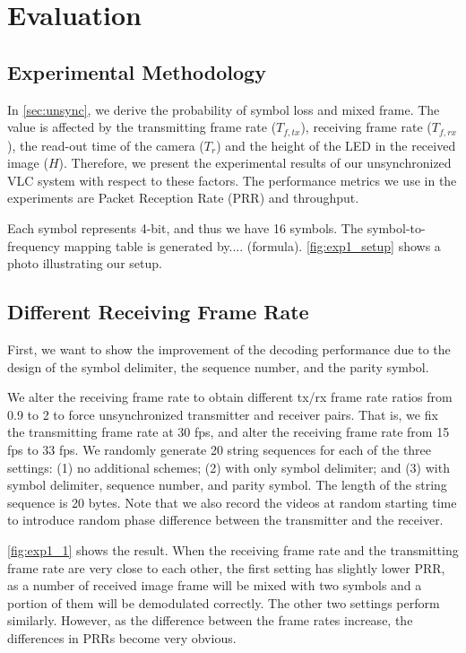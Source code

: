 \section{Evaluation}
\subsection{Experimental Methodology}
 In \autoref{sec:unsync}, we derive the probability of symbol loss and mixed frame. The value is affected by the transmitting frame rate ($T_{f,tx}$), receiving frame rate ($T_{f,rx}$), the read-out time of the camera ($T_r$) and the height of the LED in the received image ($H$). 
 Therefore, we present the experimental results of our unsynchronized VLC system with respect to these factors. The performance metrics we use in the experiments are Packet Reception Rate (PRR) and throughput.

 Each symbol represents 4-bit, and thus we have 16 symbols. 
 The symbol-to-frequency mapping table is generated by.... (formula).
 \autoref{fig:exp1_setup} shows a photo illustrating our setup. 

\subsection{Different Receiving Frame Rate}
First, we want to show the improvement of the decoding performance due to the design of the symbol delimiter, the sequence number, and the parity symbol. 

We alter the receiving frame rate to obtain different tx/rx frame rate ratios from 0.9 to 2 to force unsynchronized transmitter and receiver pairs. That is, we fix the transmitting frame rate at 30 fps, and alter the receiving frame rate from 15 fps to 33 fps. We randomly generate 20 string sequences for each of the three settings: (1) no additional schemes; (2) with only symbol delimiter; and (3) with symbol delimiter, sequence number,  and parity symbol. 
The length of the string sequence is 20 bytes. Note that we also record the videos at random starting time to introduce random phase difference between the transmitter and the receiver.

\autoref{fig:exp1_1} shows the result. When the receiving frame rate and the transmitting frame rate are very close to each other, the first setting has slightly lower PRR, as a number of received image frame will be mixed with two symbols and a portion of them will be demodulated correctly. The other two settings perform similarly. 
However, as the difference between the frame rates increase, the differences in PRRs become very obvious. 

